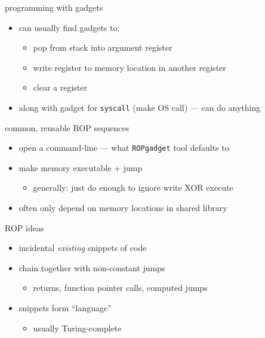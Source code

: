 \begin{frame}{programming with gadgets}
    \begin{itemize}
        \item can usually find gadgets to:
            \begin{itemize}
            \item pop from stack into argument register
            \item write register to memory location in another register
            \item clear a register
            \end{itemize}
        \item along with gadget for \texttt{syscall} (make OS call) --- can do anything
    \end{itemize}
\end{frame}

\begin{frame}{common, reusable ROP sequences}
    \begin{itemize}
        \item open a command-line --- what \texttt{ROPgadget} tool defaults to 
        \item make memory executable + jump
            \begin{itemize}
            \item generally: just do enough to ignore write XOR execute
            \end{itemize}
        \item often only depend on memory locations in shared library
    \end{itemize}
\end{frame}

\begin{frame}{ROP ideas}
    \begin{itemize}
        \item incidental \textit{existing} snippets of code
    \item chain together with non-constant jumps
        \begin{itemize}
        \item returns, function pointer calls, computed jumps
        \end{itemize}
    \item snippets form ``language''
        \begin{itemize}
        \item usually Turing-complete
        \end{itemize}
    \end{itemize}
\end{frame}
